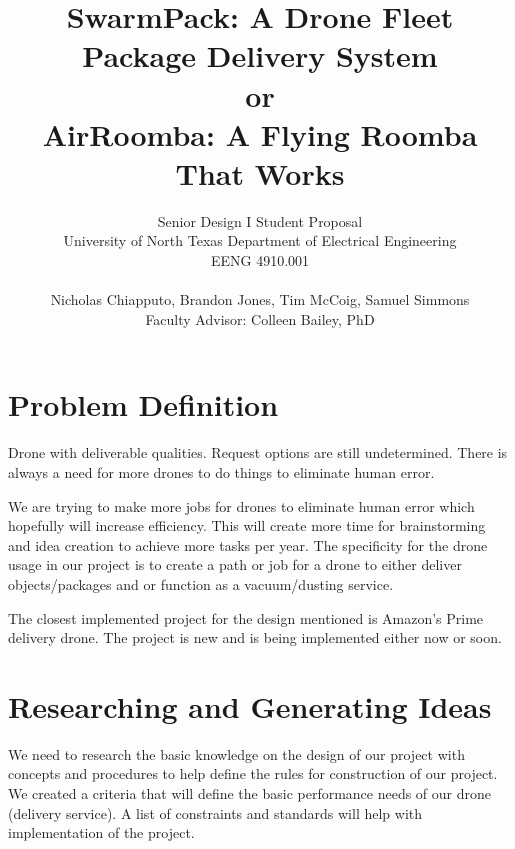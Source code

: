 \documentclass[conference]{IEEEtran}
\begin{document}
	\title{ SwarmPack: A Drone Fleet Package Delivery System \\
			or \\
			AirRoomba: A Flying Roomba That Works }

	\author{	Senior Design I Student Proposal \\
				University of North Texas Department of Electrical Engineering \\
				EENG 4910.001 \\ \\
				Nicholas Chiapputo, Brandon Jones, Tim McCoig, Samuel Simmons \\
				Faculty Advisor: Colleen Bailey, PhD
	}

	\maketitle


	\section{Problem Definition}
		Drone with deliverable qualities. Request options are still undetermined. There is always a need for more drones to do things to eliminate human error.

		We are trying to make more jobs for drones to eliminate human error which hopefully will increase efficiency. This will create more time for brainstorming and idea creation to achieve more tasks per year. The specificity for the drone usage in our project is to create a path or job for a drone to either deliver objects/packages and or function as a vacuum/dusting service.

		The closest implemented project for the design mentioned is Amazon’s Prime delivery drone. The project is new and is being implemented either now or soon.

	\section{Researching and Generating Ideas}
		We need to research the basic knowledge on the design of our project with concepts and procedures to help define the rules for construction of our project. We created a criteria that will define the basic performance needs of our drone (delivery service). A list of constraints and standards will help with implementation of the project.
\end{document}
